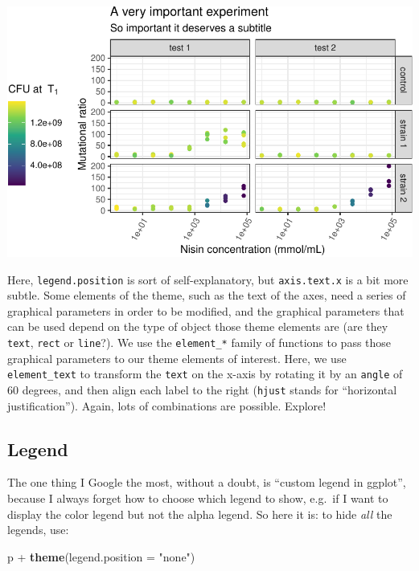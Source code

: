 \documentclass[]{book}
\newenvironment{Shaded}{}{}
\newcommand{\DataTypeTok}[1]{\textcolor[rgb]{0.56,0.13,0.00}{#1}}
\newcommand{\KeywordTok}[1]{\textcolor[rgb]{0.00,0.44,0.13}{\textbf{#1}}}
\newcommand{\NormalTok}[1]{#1}
\newcommand{\OperatorTok}[1]{\textcolor[rgb]{0.40,0.40,0.40}{#1}}
\newcommand{\StringTok}[1]{\textcolor[rgb]{0.25,0.44,0.63}{#1}}
\begin{document}
\begin{center}\includegraphics[width=\textwidth]{TRES-Tidy-Tutorial_files/figure-latex/unnamed-chunk-145-1} \end{center}

Here, \texttt{legend.position} is sort of self-explanatory, but \texttt{axis.text.x} is a bit more subtle. Some elements of the theme, such as the text of the axes, need a series of graphical parameters in order to be modified, and the graphical parameters that can be used depend on the type of object those theme elements are (are they \texttt{text}, \texttt{rect} or \texttt{line}?). We use the \texttt{element\_*} family of functions to pass those graphical parameters to our theme elements of interest. Here, we use \texttt{element\_text} to transform the \texttt{text} on the x-axis by rotating it by an \texttt{angle} of 60 degrees, and then align each label to the right (\texttt{hjust} stands for ``horizontal justification''). Again, lots of combinations are possible. Explore!

\hypertarget{legend}{%
\subsection{Legend}\label{legend}}

The one thing I Google the most, without a doubt, is ``custom legend in ggplot'', because I always forget how to choose which legend to show, e.g.~if I want to display the color legend but not the alpha legend. So here it is: to hide \emph{all} the legends, use:

\begin{Shaded}
\begin{Highlighting}[]
\NormalTok{p }\OperatorTok{+}\StringTok{ }\KeywordTok{theme}\NormalTok{(}\DataTypeTok{legend.position =} \StringTok{"none"}\NormalTok{)}
\end{Highlighting}
\end{Shaded}
\end{document}
